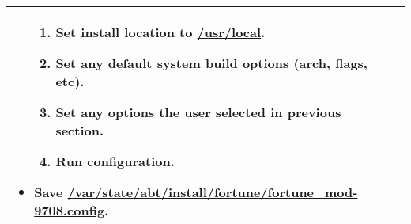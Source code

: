 \begin{tabularx}{\linewidth}{|l|X|}
\begin{minipage}{\linewidth}
\begin{itemize}
    \begin{enumerate}
      \item Set install location to \textbf{\url{/usr/local}}.
      \item Set any default system build options (arch, flags, etc).
      \item Set any options the user selected in previous section.
      \item Run \textbf{configuration}.
    \end{enumerate}
    \item Save \url{/var/state/abt/install/fortune/fortune_mod-9708.config}.
  \end{itemize}
  \vspace{0.05em}
\end{minipage}
\\
\hline 
\end{tabularx}

